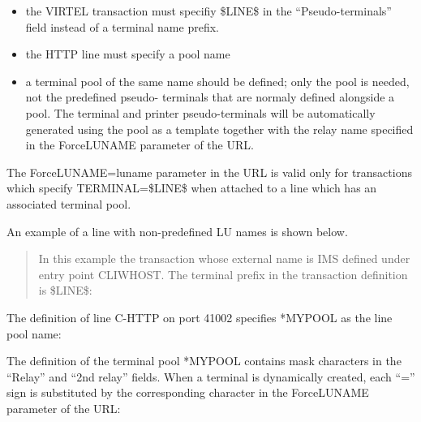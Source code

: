 \documentclass[letterpaper,10pt,english]{sphinxmanual}
\begin{document}
\begin{sphinxVerbatim}[commandchars=\\\{\}]
\end{sphinxVerbatim}
\begin{itemize}
\item {} 
the VIRTEL transaction must specifiy \$LINE\$ in the “Pseudo-terminals”
field instead of a terminal name prefix.

\item {} 
the HTTP line must specify a pool name

\item {} 
a terminal pool of the same name should be defined; only the pool is needed, not the predefined pseudo- terminals that are normaly defined alongside a pool. The terminal and printer pseudo-terminals will be automatically generated using the pool as a template together with the relay name specified in the ForceLUNAME parameter of the URL.

\end{itemize}

The ForceLUNAME=luname parameter in the URL is valid only for transactions which specify TERMINAL=\$LINE\$ when attached to a line which has an associated terminal pool.

An example of a line with non-predefined LU names is shown below.

\begin{quote}

In this example the transaction whose external name is IMS defined under entry point CLIWHOST. The terminal prefix in the transaction definition is \$LINE\$:
\end{quote}


The definition of line C-HTTP on port 41002 specifies *MYPOOL as the line pool name:


The definition of the terminal pool *MYPOOL contains mask characters in the “Relay” and “2nd relay” fields. When a terminal is dynamically created, each “=” sign is substituted by the corresponding character in the ForceLUNAME parameter of the URL:
\end{document}
